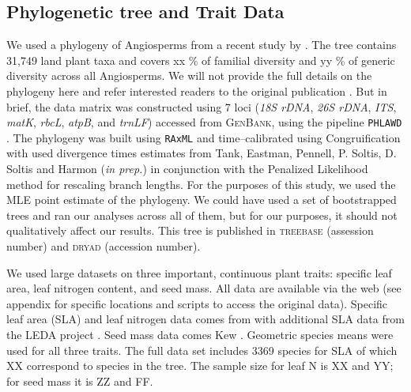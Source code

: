 \documentclass[12pt]{article}
\begin{document}
\subsection*{Phylogenetic tree and Trait Data}
We used a phylogeny of Angiosperms from a recent study by \citet{ZanneBigTree}. The tree contains 31,749 land plant taxa and covers xx \% of familial diversity and yy \% of generic diversity across all Angiosperms. We will not provide the full details on the phylogeny here and refer interested readers to the original publication \citep{ZanneBigTree}. But in brief, the data matrix was constructed using 7 loci (\textit{18S rDNA}, \textit{26S rDNA}, \textit{ITS}, \textit{matK}, \textit{rbcL}, \textit{atpB}, and \textit{trnLF}) accessed from \textsc{GenBank}, using the pipeline \texttt{PHLAWD} \citep{phlawd}. The phylogeny was built using \texttt{RAxML} \citep{raxml} and time--calibrated using Congruification \citep{Eastmancongruify} with used divergence times estimates from Tank, Eastman, Pennell, P. Soltis, D. Soltis and Harmon (\textit{in prep.}) in conjunction with the Penalized Likelihood method \citep{Sanderson1997, treepl} for rescaling branch lengths. For the purposes of this study, we used the MLE point estimate of the phylogeny. We could have used a set of bootstrapped trees and ran our analyses across all of them, but for our purposes, it should not qualitatively affect our results. This tree is published in \textsc{treebase} (assession number) and \textsc{dryad} (accession number).


We used large datasets on three important, continuous plant traits: specific leaf area, leaf nitrogen content, and seed mass.  All data are available via the web (see appendix for specific locations and scripts to access the original data). Specific leaf area (SLA) and leaf nitrogen data comes from \citet{Wright2004} with additional SLA data from the LEDA project \citep{Kleyer2008}.   Seed mass data comes Kew \citep{Kew}.  Geometric species means were used for all three traits.  The full data set includes 3369 species for SLA of which XX correspond to species in the \citet{ZanneBigTree} tree.  The sample size for leaf N is XX and YY; for seed mass it is ZZ and FF.  
\end{document}
